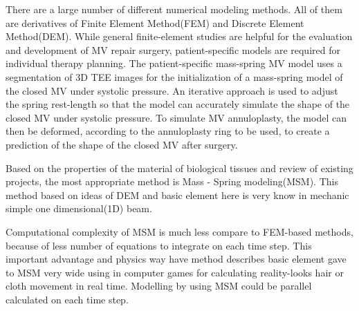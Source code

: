 There are a large number of different numerical modeling methods. All of them are
derivatives of Finite Element Method(FEM) and Discrete Element Method(DEM).
While general finite-element studies are helpful for the evaluation and
development of MV repair surgery, patient-specific models are required for
individual therapy planning. The patient-specific mass-spring MV model uses a
segmentation of 3D TEE images for the initialization of a mass-spring model of
the closed MV under systolic pressure. An iterative approach is used to adjust
the spring rest-length so that the model can accurately simulate the shape of
the closed MV under systolic pressure. To simulate MV annuloplasty, the model
can then be deformed, according to the annuloplasty ring to be used, to create a
prediction of the shape of the closed MV after surgery.

Based on the properties of the material of biological tissues and review of
existing projects, the most appropriate method is Mass - Spring modeling(MSM).
This method based on ideas of DEM and basic element here is very know in
mechanic simple one dimensional(1D) beam.

Computational complexity of MSM is much less compare to FEM-based methods,
because of less number of equations to integrate on each time step. This
important advantage and physics way have method describes basic element gave to
MSM very wide using in computer games for calculating reality-looks hair or
cloth movement in real time. Modelling by using MSM could be parallel calculated
on each time step.\cite{Rasmusson2008} \cite{Amorim2012}
